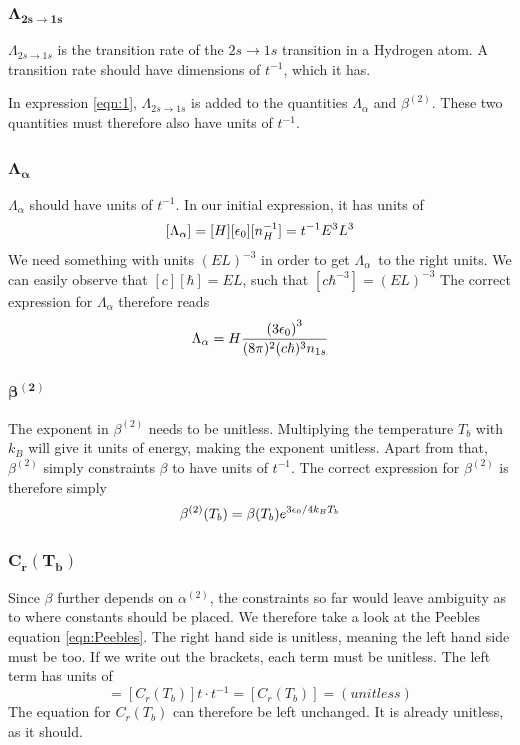 \documentclass[10pt, a4paper]{article}
\begin{document}
\subsubsection{\texorpdfstring{$\mathbf{\Lambda_{2s\rightarrow1s}}$}{TEXT} }
$\Lambda_{2s\rightarrow1s}$ is the transition rate of the $2s\rightarrow 1s$ transition in a Hydrogen atom. A transition rate should have dimensions of $t^{-1}$, which it has.

In expression \ref{eqn:1}, $\Lambda_{2s\rightarrow1s}$ is added to the quantities $\Lambda_\alpha$ and $\beta^{(2)}$. These two quantities must therefore also have units of $t^{-1}$.

\subsubsection{\texorpdfstring{$\mathbf{\Lambda_\alpha}$}{TEXT} }
$\Lambda_\alpha$ should have units of $t^{-1}$. In our initial expression, it has units of
\begin{equation*}
    \qty[\Lambda_\alpha] = [H][\epsilon_0][n_H^{-1}] = t^{-1}E^3L^3
\end{equation*}
We need something with units $(EL)^{-3}$ in order to get $\Lambda_\alpha$ to the right units. We can easily observe that $[c][\hbar] = EL$, such that $[c\hbar^{-3}] = (EL)^{-3}$ The correct expression for $\Lambda_\alpha$ therefore reads
\begin{equation*}
    \Lambda_{\alpha} =H \frac{\qty(3 \epsilon_{0})^{3}}{(8 \pi)^{2} (c\hbar)^3 n_{1 s}}
\end{equation*}

\subsubsection{\texorpdfstring{$\mathbf{\beta^{(2)}}$}{TEXT} }
The exponent in $\beta^{(2)}$ needs to be unitless. Multiplying the temperature $T_b$ with $k_B$ will give it units of energy, making the exponent unitless. Apart from that, $\beta^{(2)}$ simply constraints $\beta$ to have units of $t^{-1}$. The correct expression for $\beta^{(2)}$ is therefore simply
\begin{equation*}
    \beta^{(2)}\qty(T_{b}) =\beta\qty(T_{b}) e^{3 \epsilon_{0} / 4 k_B T_{b}}
\end{equation*}

\subsubsection{\texorpdfstring{$\mathbf{C_r(T_b)}$}{TEXT} }
Since $\beta$ further depends on $\alpha^{(2)}$, the constraints so far would leave ambiguity as to where constants should be placed. We therefore take a look at the Peebles equation \ref{eqn:Peebles}. The right hand side is unitless, meaning the left hand side must be too. If we write out the brackets, each term must be unitless. The left term has units of
\begin{equation*}
    [C_r(T_b)][H^{-1}][\beta] = [C_r(T_b)]t\cdot t^{-1} = [C_r(T_b)] = (unitless)
\end{equation*}
The equation for $C_r(T_b)$ can therefore be left unchanged. It is already unitless, as it should.
\end{document}
